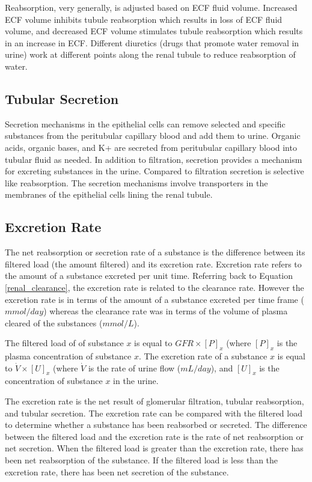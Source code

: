 Reabsorption, very generally, is adjusted based on ECF fluid volume. Increased ECF volume inhibits tubule reabsorption which results in loss of ECF fluid volume, and decreased ECF volume stimulates tubule reabsorption which results in an increase in ECF. Different diuretics (drugs that promote water removal in urine) work at different points along the renal tubule to reduce reabsorption of water.


\subsection{Tubular Secretion}

Secretion mechanisms in the epithelial cells can remove selected and specific substances from the peritubular capillary blood and add them to urine. Organic acids, organic bases, and K+ are secreted from peritubular capillary blood into tubular fluid as needed. In addition to filtration, secretion provides a mechanism for excreting substances in the urine. Compared to filtration secretion is selective like reabsorption. The secretion mechanisms involve transporters in the membranes of the epithelial cells lining the renal tubule.

\subsection{Excretion Rate}

The net reabsorption or secretion rate of a substance is the difference between its filtered load (the amount filtered) and its excretion rate. Excretion rate refers to the amount of a substance excreted per unit time. Referring back to Equation \ref{renal_clearance}, the excretion rate is related to the clearance rate. However the excretion rate is in terms of the amount of a substance excreted per time frame ($mmol/day$) whereas the clearance rate was in terms of the volume of plasma cleared of the substances ($mmol/L$). 

The filtered load of of substance $x$ is equal to  $GFR \times [P]_x$ (where $[P]_x$ is the plasma concentration of substance $x$. The excretion rate of a substance $x$ is equal to $\dot{V} \times [U]_x$ (where $\dot{V}$ is the rate of urine flow ($mL/day$), and $[U]_x$ is the concentration of substance $x$ in the urine. 

The excretion rate is the net result of glomerular filtration, tubular reabsorption, and tubular secretion. The excretion rate can be compared with the filtered load to determine whether a substance has been reabsorbed or secreted. The difference between the filtered load and the excretion rate is the rate of net reabsorption or net secretion. When the filtered load is greater than the excretion rate, there has been net reabsorption of the substance. If the filtered load is less than the excretion rate, there has been net secretion of the substance.


